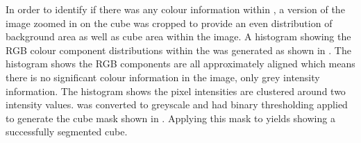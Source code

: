 In order to identify if there was any colour information within , a version of the image zoomed in on the cube was cropped to provide an even distribution of background area as well as cube area within the image. A histogram showing the RGB colour component distributions within the  was generated as shown in . The histogram shows the RGB components are all approximately aligned which means there is no significant colour information in the image, only grey intensity information. The histogram shows the pixel intensities are clustered around two intensity values.  was converted to greyscale and had binary thresholding applied to generate the cube mask shown in . Applying this mask to  yields  showing a successfully segmented cube.

